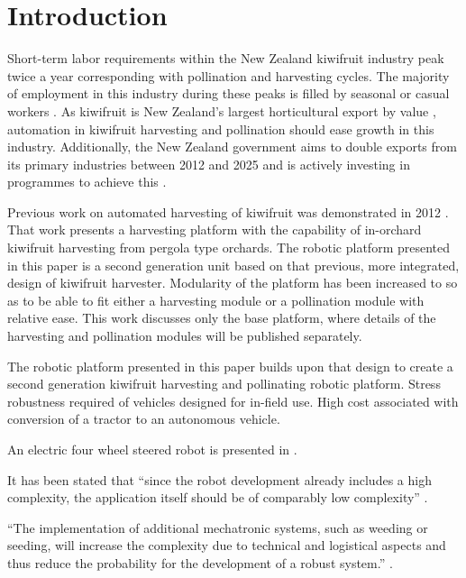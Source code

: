 \documentclass[preprint,authoryear,12pt]{elsarticle}
\begin{document}

\section{Introduction}
\label{sect:intro}
Short-term labor requirements within the New Zealand kiwifruit industry peak twice a year corresponding with pollination and harvesting cycles.
The majority of employment in this industry during these peaks is filled by seasonal or casual workers \citep{Timmins2009}.
As kiwifruit is New Zealand's largest horticultural export by value \citep{StatisticsNewZealand2015}, automation in kiwifruit harvesting and pollination should ease growth in this industry.
Additionally, the New Zealand government aims to double exports from its primary industries between 2012 and 2025 and is actively investing in programmes to achieve this \citep{MinistryPrimaryIndustries2015}.

Previous work on automated harvesting of kiwifruit was demonstrated in 2012 \citep{Scarfe2012}.
That work presents a harvesting platform with the capability of in-orchard kiwifruit harvesting from pergola type orchards.
The robotic platform presented in this paper is a second generation unit based on that previous, more integrated, design of kiwifruit harvester.
Modularity of the platform has been increased to so as to be able to fit either a harvesting module or a pollination module with relative ease.
This work discusses only the base platform, where details of the harvesting and pollination modules will be published separately.



The robotic platform presented in this paper builds upon that design to create a second generation kiwifruit harvesting and pollinating robotic platform.
Stress robustness required of vehicles designed for in-field use.
High cost associated with conversion of a tractor to an autonomous vehicle.

An electric four wheel steered robot is presented in \cite{Bak2004}.

It has been stated that ``since the robot development already includes a high complexity, the application itself should be of comparably low complexity'' \citep{Ruckelshausen2009}.

``The implementation of additional mechatronic systems, such as weeding or seeding, will increase the complexity due to technical and logistical aspects and thus reduce the probability for the development of a robust system.'' \citep{Ruckelshausen2009}.
\end{document}

